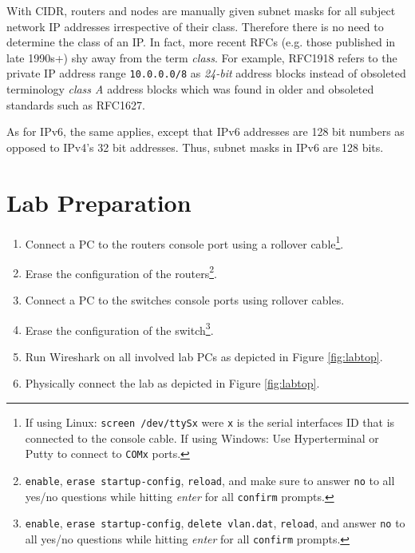 \documentclass[pdftex,12pt,a4paper]{article}
\begin{document}
            With CIDR, routers and nodes are manually given subnet masks for
            all subject network IP addresses irrespective of their class.
            Therefore there is no need to determine the class of an IP. In fact,
            more recent RFCs (e.g. those published in late 1990s+) shy away
            from the term \emph{class}. For example, RFC1918 refers to the
            private IP address range \texttt{10.0.0.0/8} as \emph{24-bit}
            address blocks instead of obsoleted terminology \emph{class A}
            address blocks which was found in older and obsoleted standards
            such as RFC1627.

            As for IPv6, the same applies, except that IPv6 addresses are 128
            bit numbers as opposed to IPv4's 32 bit addresses. Thus, subnet
            masks in IPv6 are 128 bits.

    \section{Lab Preparation}
        \begin{enumerate}
            \item Connect a PC to the routers console port using a rollover
                cable\footnote{If using Linux: \texttt{screen /dev/ttySx} were
                \texttt{x} is the
                serial interfaces ID that is connected to the console
                cable. If using Windows: Use Hyperterminal or Putty to
                connect to \texttt{COMx} ports.}.
            \item Erase the configuration of the
                routers\footnote{\texttt{enable}, \texttt{erase
                startup-config}, \texttt{reload}, and make sure to answer
                \texttt{no} to all yes/no questions while hitting
                \emph{enter} for all \texttt{confirm} prompts.}.
            \item Connect a PC to the switches console ports using rollover
                cables.
            \item Erase the configuration of the
                switch\footnote{\texttt{enable}, \texttt{erase startup-config},
                \texttt{delete vlan.dat}, \texttt{reload}, and answer
                \texttt{no} to all yes/no questions while hitting
                \emph{enter} for all \texttt{confirm} prompts.}.
            \item Run Wireshark on all involved lab PCs as depicted in Figure
                \ref{fig:labtop}.
            \item Physically connect the lab as depicted in Figure \ref{fig:labtop}.
        \end{enumerate}
\end{document}
